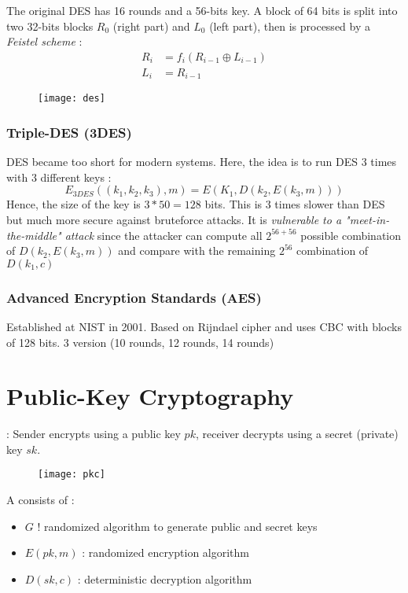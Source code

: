 The original DES has 16 rounds and a 56-bits key. A block of 64 bits is split into two 32-bits blocks $R_0$ (right part) and $L_0$ (left part), then is processed by a \textit{Feistel scheme} :
\begin{align*}
R_i &= f_i(R_{i-1} \oplus L_{i-1})\\
L_i &= R_{i-1}
\end{align*}
\begin{figure}[H]
    \centering
    \texttt{[image: des]}
\end{figure}

\subsubsection{Triple-DES (3DES)}

DES became too short for modern systems. Here, the idea is to run DES 3 times with 3 different keys :
\[
E_{3DES}((k_1, k_2, k_3), m) = E(K_1, D(k_2, E(k_3, m)))
\]
Hence, the size of the key is $3*50 = 128$ bits. This is 3 times slower than DES but much more secure against bruteforce attacks. It is \textit{vulnerable to a "meet-in-the-middle" attack} since the attacker can compute all $2^{56+56}$ possible combination of $D(k_2, E(k_3, m))$ and compare with the remaining $2^{56}$ combination of $D(k_1, c)$

\subsubsection{Advanced Encryption Standards (AES)}

Established at NIST in 2001. Based on Rijndael cipher and uses CBC with blocks of 128 bits. 3 version (10 rounds, 12 rounds, 14 rounds)

\section{Public-Key Cryptography}

 : Sender encrypts using a public key $pk$, receiver decrypts using a secret (private) key $sk$.

\begin{figure}[H]
    \centering
    \texttt{[image: pkc]}
\end{figure}

A  consists of :
\begin{itemize}
    \item $G$ ! randomized algorithm to generate public and secret keys
    \item $E(pk, m)$ : randomized encryption algorithm
    \item $D(sk, c)$ : deterministic decryption algorithm
\end{itemize}

